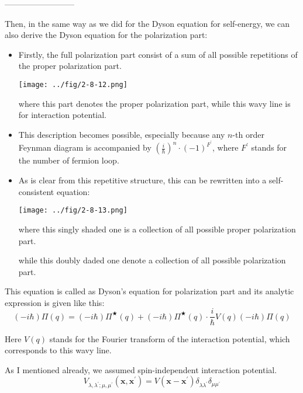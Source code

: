 \begin{center}--------------------------\end{center}

Then, in the same way as we did for the Dyson equation for self-energy, we can also derive the Dyson equation for the polarization part:

\begin{itemize}
\item Firstly, the full polarization part consist of a sum of all possible repetitions of the proper polarization part.
\begin{center} \label{Fig2.8.12}
\texttt{[image: ../fig/2-8-12.png]}
\end{center}

where this part denotes the proper polarization part, while this wavy line is for interaction potential.

\item This description becomes possible, especially because any $n$-th order Feynman diagram is accompanied by $\left( \frac{i}{\hbar} \right)^n \cdot (-1)^{F^{'}}$, where $F^{'}$ stands for the number of fermion loop.

\item As is clear from this repetitive structure, this can be rewritten into a self-consistent equation:
\begin{center} \label{Fig2.8.13}
\texttt{[image: ../fig/2-8-13.png]}
\end{center}

where this singly shaded one is a collection of all possible proper polarization part.

while this doubly daded one denote a collection of all possible polarization part.
\end{itemize}

This equation is called as Dyson's equation for polarization part and its analytic expression is given like this:
\[(-i \hbar)\Pi(q) = (-i \hbar)\Pi^{\bigstar}(q)+(-i \hbar)\Pi^{\bigstar}(q) \cdot \frac{i}{\hbar} V(q) (-i\hbar)\Pi(q)\]

Here $V(q)$ stands for the Fourier transform of the interaction potential, which corresponds to this wavy line.

As I mentioned already, we assumed spin-independent interaction potential.
\[V_{\lambda,\lambda^{'};\mu,\mu^{'}}(\mathbf{x},\mathbf{x}^{'}) = V(\mathbf{x}-\mathbf{x}^{'}) \delta_{\lambda\lambda^{'}}\delta_{\mu\mu^{'}}\]

